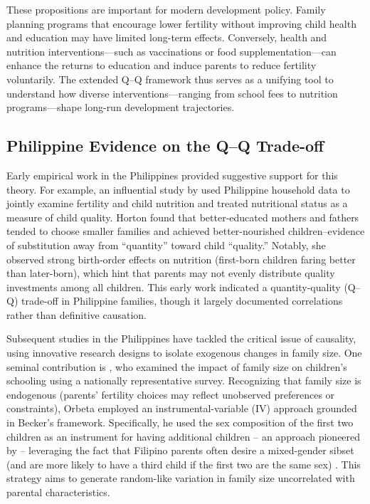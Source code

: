 \documentclass[]{AEA}
\begin{document}
These propositions are important for modern development policy. Family
planning programs that encourage lower fertility without improving child
health and education may have limited long-term effects. Conversely,
health and nutrition interventions---such as vaccinations or food
supplementation---can enhance the returns to education and induce
parents to reduce fertility voluntarily. The extended Q--Q framework
thus serves as a unifying tool to understand how diverse
interventions---ranging from school fees to nutrition programs---shape
long-run development trajectories.

\subsection{Philippine Evidence on the Q–Q Trade-off}

Early empirical work in the Philippines provided suggestive support for
this theory. For example, an influential study by
\citet{horton1986child} used Philippine household data to jointly
examine fertility and child nutrition and treated nutritional status as
a measure of child quality. Horton found that better-educated mothers
and fathers tended to choose smaller families and achieved
better-nourished children--evidence of substitution away from
``quantity'' toward child ``quality.'' Notably, she observed strong
birth-order effects on nutrition (first-born children faring better than
later-born), which hint that parents may not evenly distribute quality
investments among all children. This early work indicated a
quantity-quality (Q--Q) trade-off in Philippine families, though it
largely documented correlations rather than definitive causation.

Subsequent studies in the Philippines have tackled the critical issue of
causality, using innovative research designs to isolate exogenous
changes in family size. One seminal contribution is
\citet{orbeta2010number}, who examined the impact of family size on
children's schooling using a nationally representative survey.
Recognizing that family size is endogenous (parents' fertility choices
may reflect unobserved preferences or constraints), Orbeta employed an
instrumental-variable (IV) approach grounded in Becker's framework.
Specifically, he used the sex composition of the first two children as
an instrument for having additional children -- an approach pioneered by
\citet{angrist1996children} -- leveraging the fact that Filipino parents
often desire a mixed-gender sibset (and are more likely to have a third
child if the first two are the same sex) \citep{vicerra2013fertility}.
This strategy aims to generate random-like variation in family size
uncorrelated with parental characteristics.
\end{document}
